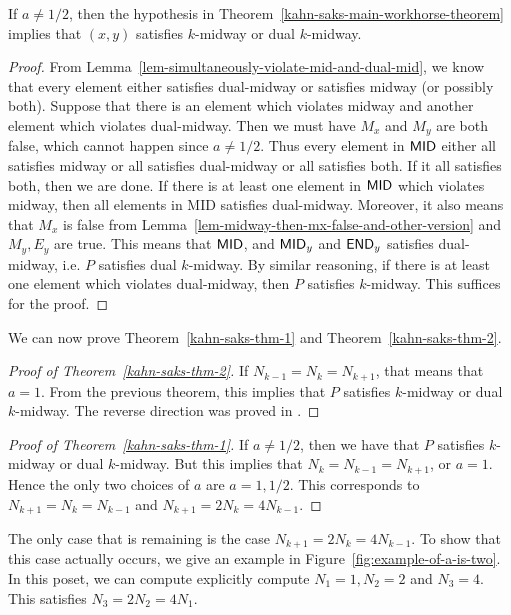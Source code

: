 \documentclass{puthesis-UG}
\begin{document}
\begin{lem}
	If $a \neq 1/2$, then the hypothesis in Theorem~\ref{kahn-saks-main-workhorse-theorem} implies that $(x, y)$ satisfies $k$-midway or dual $k$-midway. 
\end{lem}

\begin{proof}
	From Lemma~\ref{lem-simultaneously-violate-mid-and-dual-mid}, we know that every element either satisfies dual-midway or satisfies midway (or possibly both). Suppose that there is an element which violates midway and another element which violates dual-midway. Then we must have $M_x$ and $M_y$ are both false, which cannot happen since $a \neq 1/2$. Thus every element in $\mathsf{MID}$ either all satisfies midway or all satisfies dual-midway or all satisfies both. If it all satisfies both, then we are done. If there is at least one element in $\mathsf{MID}$ which violates midway, then all elements in MID satisfies dual-midway. Moreover, it also means that $M_x$ is false from Lemma~\ref{lem-midway-then-mx-false-and-other-version} and $M_y, E_y$ are true. This means that $\mathsf{MID}$, and $\mathsf{MID}_y$ and $\mathsf{END}_y$ satisfies dual-midway, i.e. $P$ satisfies dual $k$-midway. By similar reasoning, if there is at least one element which violates dual-midway, then $P$ satisfies $k$-midway. This suffices for the proof. 
\end{proof}

We can now prove Theorem~\ref{kahn-saks-thm-1} and Theorem~\ref{kahn-saks-thm-2}. 

\begin{proof}[Proof of Theorem~\ref{kahn-saks-thm-2}]
	If $N_{k-1} = N_k = N_{k+1}$, that means that $a = 1$. From the previous theorem, this implies that $P$ satisfies $k$-midway or dual $k$-midway. The reverse direction was proved in \cite{chan2022extensions}. 
\end{proof}

\begin{proof}[Proof of Theorem~\ref{kahn-saks-thm-1}]
	If $a \neq 1/2$, then we have that $P$ satisfies $k$-midway or dual $k$-midway. But this implies that $N_k = N_{k-1} = N_{k+1}$, or $a = 1$. Hence the only two choices of $a$ are $a = 1, 1/2$. This corresponds to $N_{k+1} = N_k = N_{k-1}$ and $N_{k+1} = 2N_k = 4 N_{k-1}$. 
\end{proof}

The only case that is remaining is the case $N_{k+1} = 2N_k = 4 N_{k-1}$. To show that this case actually occurs, we give an example in Figure~\ref{fig:example-of-a-is-two}. In this poset, we can compute explicitly compute $N_1 = 1, N_2 = 2$ and $N_3 = 4$. This satisfies $N_3 = 2N_2 = 4N_1$. 
\end{document}
